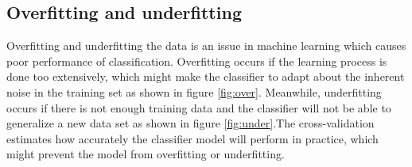 \documentclass[USenglish]{ifimaster}  %
\begin{document}
\subsection{Overfitting and underfitting}
Overfitting and underfitting the data is an issue in machine learning which causes poor performance of classification. Overfitting occurs if the learning process is done too extensively, which might make the classifier to adapt about the inherent noise in the training set as shown in figure \ref{fig:over}. Meanwhile, underfitting occurs if there is not enough training data and the classifier will not be able to generalize a new data set as shown in figure \ref{fig:under}.The cross-validation estimates how accurately the classifier model will perform in practice, which might prevent the model from overfitting or underfitting.
\end{document}

